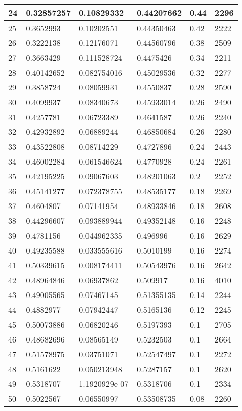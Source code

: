 \begin{longtable}{|l|l|l|l|l|l|}
24 & 0.32857257 & 0.10829332 & 0.44207662 & 0.44 & 2296 \\ \hline 
25 & 0.3652993 & 0.10202551 & 0.44350463 & 0.42 & 2222 \\ \hline 
26 & 0.3222138 & 0.12176071 & 0.44560796 & 0.38 & 2509 \\ \hline 
27 & 0.3663429 & 0.111528724 & 0.4475426 & 0.34 & 2211 \\ \hline 
28 & 0.40142652 & 0.082754016 & 0.45029536 & 0.32 & 2277 \\ \hline 
29 & 0.3858724 & 0.08059931 & 0.4550837 & 0.28 & 2590 \\ \hline 
30 & 0.4099937 & 0.08340673 & 0.45933014 & 0.26 & 2490 \\ \hline 
31 & 0.4257781 & 0.06723389 & 0.4641587 & 0.26 & 2240 \\ \hline 
32 & 0.42932892 & 0.06889244 & 0.46850684 & 0.26 & 2280 \\ \hline 
33 & 0.43522808 & 0.08714229 & 0.4727896 & 0.24 & 2443 \\ \hline 
34 & 0.46002284 & 0.061546624 & 0.4770928 & 0.24 & 2261 \\ \hline 
35 & 0.42195225 & 0.09067603 & 0.48201063 & 0.2 & 2252 \\ \hline 
36 & 0.45141277 & 0.072378755 & 0.48535177 & 0.18 & 2269 \\ \hline 
37 & 0.4604807 & 0.07141954 & 0.48933846 & 0.18 & 2608 \\ \hline 
38 & 0.44296607 & 0.093889944 & 0.49352148 & 0.16 & 2248 \\ \hline 
39 & 0.4781156 & 0.044962335 & 0.496996 & 0.16 & 2629 \\ \hline 
40 & 0.49235588 & 0.033555616 & 0.5010199 & 0.16 & 2274 \\ \hline 
41 & 0.50339615 & 0.008174411 & 0.50543976 & 0.16 & 2642 \\ \hline 
42 & 0.48964846 & 0.06937862 & 0.509917 & 0.16 & 4010 \\ \hline 
43 & 0.49005565 & 0.07467145 & 0.51355135 & 0.14 & 2244 \\ \hline 
44 & 0.4882977 & 0.07942447 & 0.5165136 & 0.12 & 2245 \\ \hline 
45 & 0.50073886 & 0.06820246 & 0.5197393 & 0.1 & 2705 \\ \hline 
46 & 0.48682696 & 0.08565149 & 0.5232503 & 0.1 & 2664 \\ \hline 
47 & 0.51578975 & 0.03751071 & 0.52547497 & 0.1 & 2272 \\ \hline 
48 & 0.5161622 & 0.050213948 & 0.5287157 & 0.1 & 2620 \\ \hline 
49 & 0.5318707 & 1.1920929e-07 & 0.5318706 & 0.1 & 2334 \\ \hline 
50 & 0.5022567 & 0.06550997 & 0.53508735 & 0.08 & 2260 \\ \hline 
\end{longtable}
